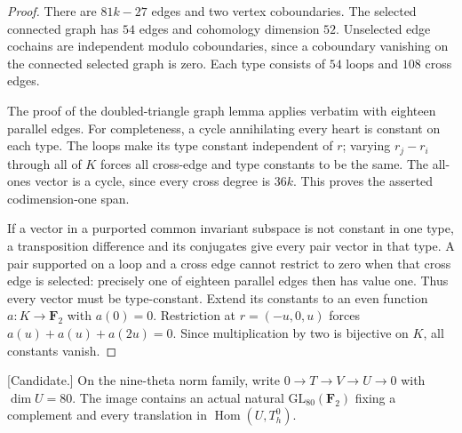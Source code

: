 \begin{proof}
There are $81k-27$ edges and two vertex coboundaries. The selected
connected graph has $54$ edges and cohomology dimension $52$.
Unselected edge cochains are independent modulo coboundaries,
since a coboundary vanishing on the connected selected graph is
zero. Each type consists of $54$ loops and $108$ cross edges.

The proof of the doubled-triangle graph lemma applies verbatim
with eighteen parallel edges. For completeness, a cycle annihilating
every heart is constant on each type. The loops make its type
constant independent of $r$; varying $r_j-r_i$ through all of $K$
forces all cross-edge and type constants to be the same. The
all-ones vector is a cycle, since every cross degree is $36k$.
This proves the asserted codimension-one span.

If a vector in a purported common invariant subspace is not
constant in one type, a transposition difference and its conjugates
give every pair vector in that type. A pair supported on a loop
and a cross edge cannot restrict to zero when that cross edge is
selected: precisely one of eighteen parallel edges then has value
one. Thus every vector must be type-constant. Extend its constants
to an even function $a:K\to\mathbf F_2$ with $a(0)=0$.
Restriction at $r=(-u,0,u)$ forces
$a(u)+a(u)+a(2u)=0$. Since multiplication by two is bijective on
$K$, all constants vanish.
\end{proof}

\begin{proposition}
\label{prop:nine-theta-full-gluing-candidate}
\textup{[Candidate.]}
On the nine-theta norm family, write
$0\to T\to V\to U\to0$ with $\dim U=80$.
The image contains an actual natural $\mathrm{GL}_{80}(\mathbf F_2)$
fixing a complement and every translation in $\operatorname{Hom}(U,T_h^0)$.
\end{proposition}

